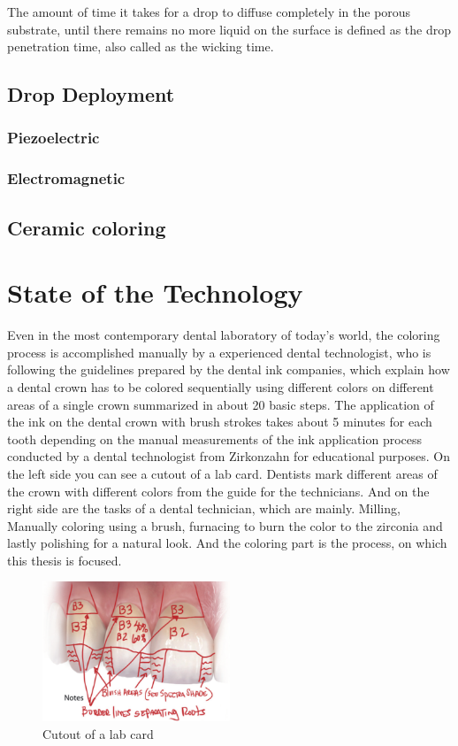 The amount of time it takes for a drop to diffuse completely in the porous substrate, until there remains no more liquid on the surface is defined as the drop penetration time, also called as the wicking time.

\section{Drop Deployment}


\subsection{Piezoelectric}


\subsection{Electromagnetic}
\label{sec:freiheitsgrad_eines_getriebes}


\section{Ceramic coloring}
\label{sec:grundlagen_für_die_kinematischen_betrachtungen}


\chapter{State of the Technology}
\label{sec:stand_technik}
Even in the most contemporary dental laboratory of today's world, the coloring process is accomplished manually by a experienced dental technologist, who is following the guidelines prepared by the dental ink companies, which explain how a dental crown has to be colored sequentially using different colors on different areas of a single crown summarized in about 20 basic steps. The application of the ink on the dental crown with brush strokes takes about 5 minutes for each tooth depending on the manual measurements of the ink application process conducted by a dental technologist from Zirkonzahn for educational purposes.
On the left side you can see a cutout of a lab card. Dentists mark different areas of the crown with different colors from the guide for the technicians.
And on the right side are the tasks of a dental technician, which are mainly. Milling, Manually coloring using a brush, furnacing to burn the color to the zirconia and lastly polishing for a natural look.
And the coloring part is the process, on which this thesis is focused.
\begin{figure}[h]
	\centering
	\includegraphics[width=0.5\textwidth]{grafiken/lab_card.png}
			\caption{Cutout of a lab card \citep{sharpling2014}}
	\label{fig:lab_card}
\end{figure}

